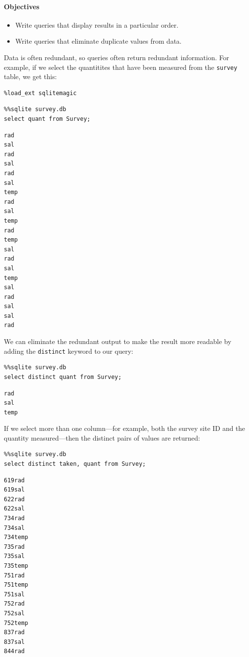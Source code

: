 \documentclass[]{book}
\begin{document}
\mbox{}\paragraph{Objectives}

\begin{itemize}
\item
  Write queries that display results in a particular order.
\item
  Write queries that eliminate duplicate values from data.
\end{itemize}

Data is often redundant, so queries often return redundant information.
For example, if we select the quantitites that have been measured from
the \texttt{survey} table, we get this:

\begin{verbatim}
%load_ext sqlitemagic
\end{verbatim}

\begin{verbatim}
%%sqlite survey.db
select quant from Survey;
\end{verbatim}

\begin{verbatim}
rad
sal
rad
sal
rad
sal
temp
rad
sal
temp
rad
temp
sal
rad
sal
temp
sal
rad
sal
sal
rad
\end{verbatim}

We can eliminate the redundant output to make the result more readable
by adding the \texttt{distinct} keyword to our query:

\begin{verbatim}
%%sqlite survey.db
select distinct quant from Survey;
\end{verbatim}

\begin{verbatim}
rad
sal
temp
\end{verbatim}

If we select more than one column---for example, both the survey site ID
and the quantity measured---then the distinct pairs of values are
returned:

\begin{verbatim}
%%sqlite survey.db
select distinct taken, quant from Survey;
\end{verbatim}

\begin{verbatim}
619rad
619sal
622rad
622sal
734rad
734sal
734temp
735rad
735sal
735temp
751rad
751temp
751sal
752rad
752sal
752temp
837rad
837sal
844rad
\end{verbatim}
\end{document}
